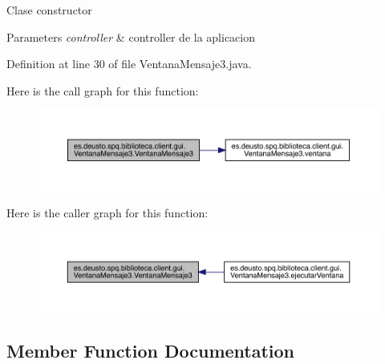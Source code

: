 Clase constructor 
\begin{DoxyParams}{Parameters}
{\em controller} & controller de la aplicacion \\
\hline
\end{DoxyParams}


Definition at line 30 of file Ventana\+Mensaje3.\+java.

Here is the call graph for this function\+:
\nopagebreak
\begin{figure}[H]
\begin{center}
\leavevmode
\includegraphics[width=350pt]{classes_1_1deusto_1_1spq_1_1biblioteca_1_1client_1_1gui_1_1_ventana_mensaje3_ad2b35ffb774851d61a99580701b9f91f_cgraph}
\end{center}
\end{figure}
Here is the caller graph for this function\+:
\nopagebreak
\begin{figure}[H]
\begin{center}
\leavevmode
\includegraphics[width=350pt]{classes_1_1deusto_1_1spq_1_1biblioteca_1_1client_1_1gui_1_1_ventana_mensaje3_ad2b35ffb774851d61a99580701b9f91f_icgraph}
\end{center}
\end{figure}


\subsection{Member Function Documentation}
\mbox{\label{classes_1_1deusto_1_1spq_1_1biblioteca_1_1client_1_1gui_1_1_ventana_mensaje3_ae5d8b8c6e4b454d53bae4af558a869e0}} 
